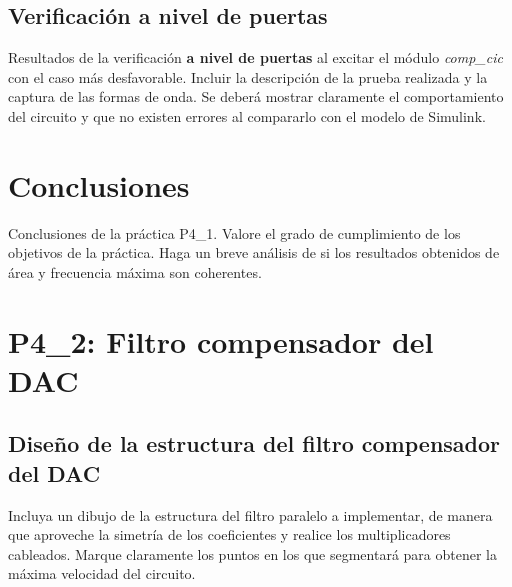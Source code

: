 \documentclass[parskip,a4paper,12pt]{article}
\begin{document}
\subsection{Verificación a nivel de puertas}
 \begin{enunciado}{}{}%
Resultados de la verificación \textbf{a nivel de puertas} al excitar el módulo \emph{comp\_cic} con el caso más desfavorable. Incluir la descripción de la prueba realizada y la captura de las formas de onda. Se deberá mostrar claramente el comportamiento del circuito y que no existen errores al compararlo con el modelo de Simulink. 

\end{enunciado}

\section{Conclusiones}
\begin{enunciado}{}{}%
Conclusiones de la práctica P4\_1. Valore el grado de cumplimiento de los objetivos de la práctica. Haga un breve análisis de si los resultados obtenidos de área y frecuencia máxima son coherentes.  

\end{enunciado}


\section{P4\_2: Filtro compensador del DAC}
\subsection{Diseño de la estructura del filtro compensador del DAC}
\begin{enunciado}{}{}%
Incluya un dibujo de la estructura del filtro paralelo a implementar, de manera que aproveche la simetría de los coeficientes y realice los multiplicadores cableados. Marque claramente los puntos en los que segmentará para obtener la máxima velocidad del circuito.
\end{enunciado}
\end{document}
